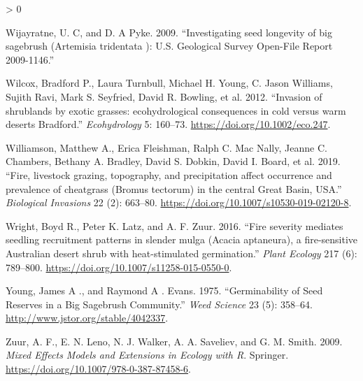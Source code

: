 \documentclass[
  12pt,
]{article}
\newlength{\cslhangindent}
\newenvironment{CSLReferences}[2] %
 {%
  \setlength{\parindent}{0pt}
  \ifodd #1 \everypar{\setlength{\hangindent}{\cslhangindent}}\ignorespaces\fi
  \ifnum #2 > 0
  \setlength{\parskip}{#2\baselineskip}
  \fi
 }%
 {}
\begin{document}
\begin{CSLReferences}{1}{0}
\leavevmode\hypertarget{ref-Wijayratne2009}{}%
Wijayratne, U. C, and D. A Pyke. 2009. {``{Investigating seed longevity
of big sagebrush (Artemisia tridentata ): U.S. Geological Survey
Open-File Report 2009-1146}.''}

\leavevmode\hypertarget{ref-Wilcox2012}{}%
Wilcox, Bradford P., Laura Turnbull, Michael H. Young, C. Jason
Williams, Sujith Ravi, Mark S. Seyfried, David R. Bowling, et al. 2012.
{``{Invasion of shrublands by exotic grasses: ecohydrological
consequences in cold versus warm deserts Bradford}.''}
\emph{Ecohydrology} 5: 160--73. \url{https://doi.org/10.1002/eco.247}.

\leavevmode\hypertarget{ref-Williamson2019}{}%
Williamson, Matthew A., Erica Fleishman, Ralph C. Mac Nally, Jeanne C.
Chambers, Bethany A. Bradley, David S. Dobkin, David I. Board, et al.
2019. {``{Fire, livestock grazing, topography, and precipitation affect
occurrence and prevalence of cheatgrass (Bromus tectorum) in the central
Great Basin, USA}.''} \emph{Biological Invasions} 22 (2): 663--80.
\url{https://doi.org/10.1007/s10530-019-02120-8}.

\leavevmode\hypertarget{ref-Wright2016}{}%
Wright, Boyd R., Peter K. Latz, and A. F. Zuur. 2016. {``{Fire severity
mediates seedling recruitment patterns in slender mulga (Acacia
aptaneura), a fire-sensitive Australian desert shrub with
heat-stimulated germination}.''} \emph{Plant Ecology} 217 (6): 789--800.
\url{https://doi.org/10.1007/s11258-015-0550-0}.

\leavevmode\hypertarget{ref-Young1975}{}%
Young, James A ., and Raymond A . Evans. 1975. {``{Germinability of Seed
Reserves in a Big Sagebrush Community}.''} \emph{Weed Science} 23 (5):
358--64. \url{http://www.jstor.org/stable/4042337}.

\leavevmode\hypertarget{ref-Zuur2009}{}%
Zuur, A. F., E. N. Leno, N. J. Walker, A. A. Saveliev, and G. M. Smith.
2009. \emph{{Mixed Effects Models and Extensions in Ecology with R}}.
Springer. \url{https://doi.org/10.1007/978-0-387-87458-6}.

\end{CSLReferences}
\end{document}
